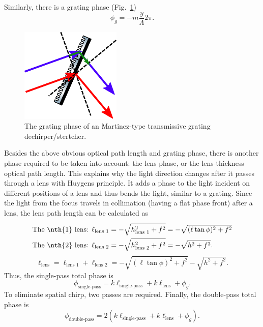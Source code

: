 \documentclass[12pt,hidelinks]{book}
\begin{document}
Similarly, there is a grating phase (Fig.~\ref{fig:transmissive_Martinez_grating_phase})
\begin{equation}
\phi_g=-m\frac{y}{\Lambda}2\pi.
\end{equation}
\begin{figure}[htbp]
\centering
\includegraphics[scale=1]{transmissive Martinez_grating phase.pdf}
\caption{The grating phase of an Martinez-type transmissive grating dechirper/stertcher.}
\label{fig:transmissive_Martinez_grating_phase}
\end{figure}

Besides the above obvious optical path length and grating phase, there is another phase required to be taken into account: the lens phase, or the lens-thickness optical path length. This explains why the light direction changes after it passes through a lens with Huygens principle. It adds a phase to the light incident on different positions of a lens and thus bends the light, similar to a grating. Since the light from the focus travels in collimation (having a flat phase front) after a lens, the lens path length can be calculated as
\begin{subequations}
\begin{align}
& \text{The \nth{1} lens: }\ell_{\text{lens 1}}=-\sqrt{h_{\text{lens 1}}^2+f^2}=-\sqrt{(\ell\tan\phi)^2+f^2} \\
& \text{The \nth{2} lens: }\ell_{\text{lens 2}}=-\sqrt{h_{\text{lens 2}}^2+f^2}=-\sqrt{h^2+f^2}.
\end{align}
\end{subequations}
\begin{equation}
\ell_{\text{lens}}=\ell_{\text{lens 1}}+\ell_{\text{lens 2}}=-\sqrt{(\ell\tan\phi)^2+f^2}-\sqrt{h^2+f^2}.
\end{equation}
Thus, the single-pass total phase is
\begin{equation}
\phi_{\text{single-pass}}=k\ell_{\text{single-pass}}+k\ell_{\text{lens}}+\phi_g.
\end{equation}
To eliminate spatial chirp, two passes are required. Finally, the double-pass total phase is
\begin{equation}
\phi_{\text{double-pass}}=2\left(k\ell_{\text{single-pass}}+k\ell_{\text{lens}}+\phi_g\right).
\end{equation}
\end{document}
